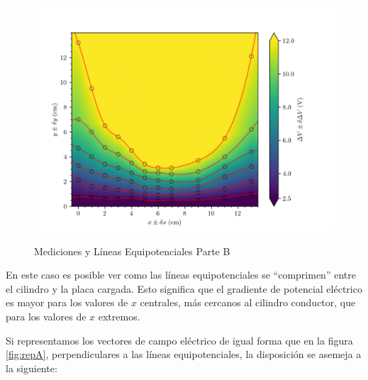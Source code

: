 \documentclass{article}
\begin{document}
\begin{figure}[H]
  \hspace{-0.1cm}\includegraphics[scale=0.2]{plot2.png}
  \label{fig:leqB}
  \caption{Mediciones y Líneas Equipotenciales Parte B}
\end{figure}

En este caso es posible ver como las líneas equipotenciales se ``comprimen'' entre el cilindro y la placa cargada. Esto significa que el gradiente de potencial eléctrico es mayor para los valores de $x$ centrales, más cercanos al cilindro conductor, que para los valores de $x$ extremos.

Si representamos los vectores de campo eléctrico de igual forma que en la figura \ref{fig:repA}, perpendiculares a las líneas equipotenciales, la disposición se asemeja a la siguiente:

\phantom{x}
\end{document}

